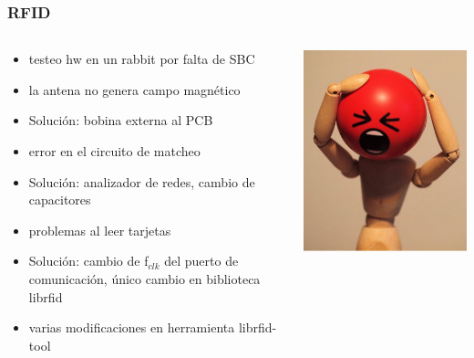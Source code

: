 \documentclass{beamer}
\begin{document}
\begin{frame}
	\frametitle{RFID}
	\begin{columns}
		\begin{column}{10cm}
			\begin{itemize}
				\item testeo hw en un rabbit por falta de SBC
		
				\bigskip
				\item la antena no genera campo magnético
				\item[ ] Solución: bobina externa al PCB

				\bigskip		
				\item error en el circuito de matcheo 
				\item[ ] Solución: analizador de redes, cambio de capacitores
		
				\bigskip
				\item problemas al leer tarjetas
				\item[ ] Solución: cambio de f$_{clk}$ del puerto de comunicación, único cambio en 									 biblioteca librfid
		
				\bigskip
				\item varias modificaciones en herramienta librfid-tool
			\end{itemize}
		\end{column}
		
		\begin{column}{1.5cm}
				\includegraphics[scale=.6]{Imagenes/no.jpg}
		\end{column}
	\end{columns}
\end{frame}
\end{document}
